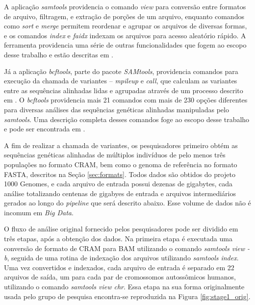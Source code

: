\documentclass[cic,tc]{iiufrgs}
\begin{document}
A aplicação \textit{samtools} providencia o comando \textit{view} para conversão entre
formatos de arquivo, filtragem, e extração de porções de um arquivo, enquanto
comandos como \textit{sort} e \textit{merge} permitem reordenar e agrupar os
arquivos de diversas formas, e os comandos \textit{index} e \textit{faidx}
indexam os arquivos para acesso aleatório rápido. A ferramenta providencia uma
série de outras funcionalidades que fogem ao escopo desse trabalho e estão
descritas em \cite{danecek2021twelve}.

Já a aplicação \textit{bcftools}, parte do pacote \textit{SAMtools}, providencia comandos para
execução da chamada de variantes -- \textit{mpileup} e \textit{call}, que
calculam as variantes entre as sequências alinhadas lidas e agrupadas através
de um processo descrito em \cite{li2011improving}. O \textit{bcftools} providencia mais
21 comandos com mais de 230 opções diferentes para diversas análises das
sequências genéticas alinhadas manipuladas pelo \textit{samtools}. Uma descrição
completa desses comandos foge ao escopo desse trabalho e pode ser encontrada em
\cite{danecek2021twelve}.

A fim de realizar a chamada de variantes, os pesquisadores primeiro obtém as
sequências genéticas alinhadas de múltiplos indivíduos de pelo menos três
populações no formato CRAM, bem como o genoma de referência no formato FASTA,
descritos na Seção \ref{sec:formats}. Todos dados são obtidos do projeto 1000
Genomes, e cada arquivo de entrada possui dezenas de gigabytes, cada análise
totalizando centenas de gigabyes de entrada e arquivos intermediários gerados
ao longo do \textit{pipeline} que será descrito abaixo. Esse volume de dados
não é incomum em \textit{Big Data}.

O fluxo de análise original fornecido pelos pesquisadores pode ser dividido em
três etapas, após a obtenção dos dados. Na primeira etapa é executada uma
conversão de formato de CRAM para BAM utilizando o comando \textit{samtools
view -b}, seguida de uma rotina de indexação dos arquivos utilizando
\textit{samtools index}. Uma vez convertidos e indexados, cada arquivo de
entrada é separado em 22 arquivos de saída, um para cada par de cromossomos
autossômicos humanos, utilizando o comando \textit{samtools view chr}. Essa
etapa na sua forma originalmente usada pelo grupo de pesquisa encontra-se
reproduzida na Figura \ref{fig:stage1_orig}.
\end{document}
